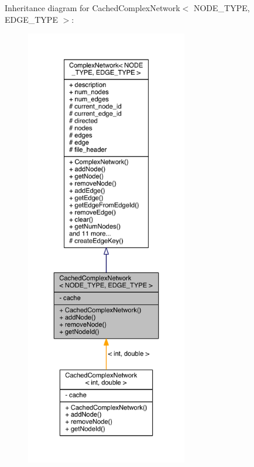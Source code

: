Inheritance diagram for Cached\+Complex\+Network$<$ N\+O\+D\+E\+\_\+\+T\+Y\+P\+E, E\+D\+G\+E\+\_\+\+T\+Y\+P\+E $>$\+:\nopagebreak
\begin{figure}[H]
\begin{center}
\leavevmode
\includegraphics[height=550pt]{class_cached_complex_network__inherit__graph}
\end{center}
\end{figure}


